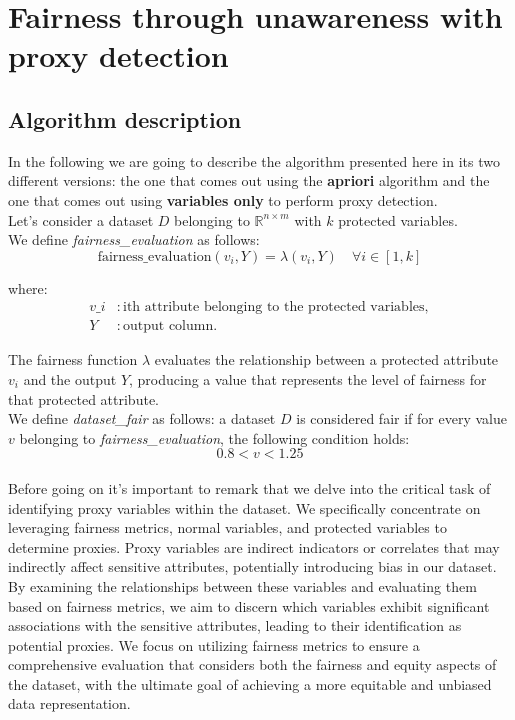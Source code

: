 \documentclass[12pt,a4paper,openright,twoside]{book}
\begin{document}
\section{Fairness through unawareness with proxy detection}

\subsection{Algorithm description}
In the following we are going to describe the algorithm presented here in its two different versions: the one that comes out using the \textbf{apriori} algorithm and the one that comes out using \textbf{variables only} to perform proxy detection. \\

Let's consider a dataset \( D \) belonging to \( \mathbb{R}^{n \times m} \) with \( k \) protected variables. \\

We define \textit{fairness\_evaluation} as follows:
\[
\text{fairness\_evaluation}(v_i, Y) = \lambda(v_i, Y) \quad \forall i \in [1, k]
\]

where:
\begin{align*}
v\_i & : \text{ith attribute belonging to the protected variables}, \\
Y & : \text{output column}.
\end{align*}

The fairness function \( \lambda \) evaluates the relationship between a protected attribute \( v_i \) and the output \( Y \), producing a value that represents the level of fairness for that protected attribute. \\

We define \textit{dataset\_fair} as follows: a dataset \( D \) is considered fair if for every value \( v \) belonging to \textit{fairness\_evaluation}, the following condition holds:
\[ 0.8  < v < 1.25 \] \\

Before going on it's important to remark that we delve into the critical task of identifying proxy variables within the dataset. We specifically concentrate on leveraging fairness metrics, normal variables, and protected variables to determine proxies. Proxy variables are indirect indicators or correlates that may indirectly affect sensitive attributes, potentially introducing bias in our dataset. By examining the relationships between these variables and evaluating them based on fairness metrics, we aim to discern which variables exhibit significant associations with the sensitive attributes, leading to their identification as potential proxies. We focus on utilizing fairness metrics to ensure a comprehensive evaluation that considers both the fairness and equity aspects of the dataset, with the ultimate goal of achieving a more equitable and unbiased data representation. \\
\end{document}
